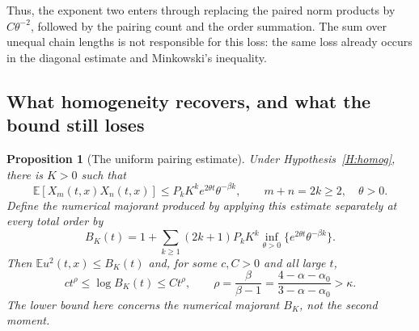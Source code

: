 \documentclass[12pt]{article}
\numberwithin{equation}{section}
\newtheorem{proposition}[theorem]{Proposition}
\theoremstyle{definition}
\newcommand{\E}{\mathbb{E}}
\begin{document}
Thus, the exponent two enters through replacing the paired norm products
by $C\theta^{-2}$, followed by the pairing count and the order summation.
The sum over unequal chain lengths is not responsible for this loss:
the same loss already occurs in the diagonal estimate and Minkowski's
inequality.

\subsection{What homogeneity recovers, and what the bound still loses}

\begin{proposition}[The uniform pairing estimate]\label{P:envelope}
  Under Hypothesis~\ref{H:homog}, there is $K>0$ such that
  \begin{equation}\label{E:homogeneous-envelope}
    \E[X_m(t,x)X_n(t,x)]
    \le P_k K^k e^{2\theta t}\theta^{-\beta k},
    \qquad m+n=2k\ge2,\quad\theta>0.
  \end{equation}
  Define the numerical majorant produced by applying this estimate
  separately at every total order by
  \begin{equation}\label{E:B-envelope}
    B_K(t)=1+\sum_{k\ge1}(2k+1)P_kK^k
    \inf_{\theta>0}\{e^{2\theta t}\theta^{-\beta k}\}.
  \end{equation}
  Then $\E u^2(t,x)\le B_K(t)$ and, for some $c,C>0$ and all large $t$,
  \begin{equation}\label{E:envelope-growth}
    ct^{\rho}\le\log B_K(t)\le Ct^{\rho},\qquad
    \rho=\frac{\beta}{\beta-1}
    =\frac{4-\alpha-\alpha_0}{3-\alpha-\alpha_0}>\kappa.
  \end{equation}
  The lower bound here concerns the numerical majorant $B_K$, not the
  second moment.
\end{proposition}
\end{document}
